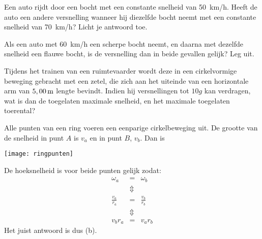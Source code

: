\documentclass{ximera}
\begin{document}
\begin{exercise}
	Een auto rijdt door een bocht met een constante snelheid van \SI{50}{km/h}. Heeft de auto een andere versnelling wanneer hij diezelfde bocht neemt met een constante snelheid van \SI{70}{km/h}? Licht je antwoord toe.
\end{exercise}

\begin{exercise}
	Als een auto met \SI{60}{km/h} een scherpe bocht neemt, en daarna met dezelfde snelheid een flauwe bocht, is de versnelling dan in beide gevallen gelijk? Leg uit.
\end{exercise}

\begin{exercise}
	Tijdens het trainen van een ruimtevaarder wordt deze in een cirkelvormige beweging gebracht met een zetel, die zich aan het uiteinde van een horizontale arm van $5,00\rm\,m$ lengte bevindt. Indien hij versnellingen tot $10g$ kan verdragen, wat is dan de toegelaten maximale snelheid, en het maximale toegelaten toerental?
\end{exercise}

\begin{exercise}
	Alle punten van een ring voeren een eenparige cirkelbeweging uit. De grootte van de snelheid in punt $A$ is $v_a$ en in punt $B$, $v_b$. Dan is
	\newline

	\begin{minipage}{0.5\textwidth}
		\begin{multipleChoice}
		\end{multipleChoice}
	\end{minipage}
	\hfill
	\begin{minipage}{0.5\textwidth}
		\begin{image}
			\texttt{[image: ringpunten]}
		\end{image}
	\end{minipage}

\begin{oplossing}
	De hoeksnelheid is voor beide punten gelijk zodat:
\begin{eqnarray*}
\omega_a&=&\omega_b\\
&\Updownarrow&\\
\frac{v_a}{r_a}&=&\frac{v_b}{r_b}\\
&\Updownarrow&\\
v_br_a&=&v_ar_b
\end{eqnarray*}
Het juist antwoord is dus (b).
\end{oplossing}
\end{exercise}
\end{document}
